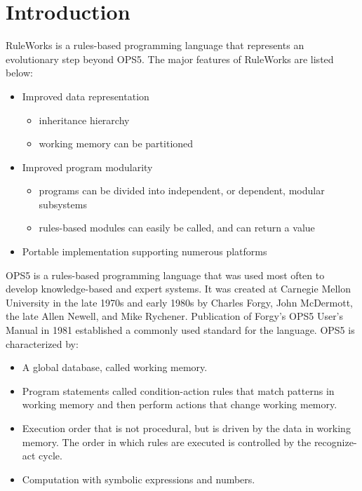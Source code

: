 \chapter{Introduction}
\label{c:intro}

RuleWorks is a rules-based programming language that represents an
evolutionary step beyond OPS5. The major features of RuleWorks are
listed below:

\begin{itemize}
\item Improved data representation
\begin{itemize}
\item inheritance hierarchy
\item working memory can be partitioned
\end{itemize}
\item Improved program modularity
  \begin{itemize}
  \item programs can be divided into independent, or dependent,
    modular subsystems
  \item rules-based modules can easily be called, and can return a
    value
  \end{itemize}
\item Portable implementation supporting numerous platforms
\end{itemize}

OPS5 is a rules-based programming language that was used most often to
develop knowledge-based and expert systems. It was created at Carnegie
Mellon University in the late 1970s and early 1980s by Charles Forgy,
John McDermott, the late Allen Newell, and Mike Rychener. Publication
of Forgy's OPS5 User's Manual in 1981 established a commonly used
standard for the language. OPS5 is characterized by:

\begin{itemize}
\item A global database, called working memory.
\item Program statements called condition-action rules that match
  patterns in working memory and then perform actions that change
  working memory.
\item Execution order that is not procedural, but is driven by the
  data in working memory. The order in which rules are executed is
  controlled by the recognize-act cycle.
\item Computation with symbolic expressions and numbers.
\end{itemize}

